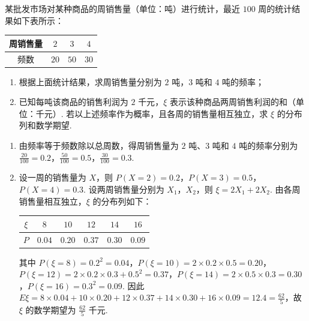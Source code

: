 \begin{problem}
某批发市场对某种商品的周销售量（单位：吨）进行统计，最近 \(100\text{ 周}\)的统计结果如下表所示：

\begin{center}
\begin{tabular}{c|ccc}
周销售量 & \(2\) & \(3\) & \(4\) \\
\hline
频数 & \(20\) & \(50\) & \(30\)
\end{tabular}
\end{center}

\begin{enumerate}
\item 根据上面统计结果，求周销售量分别为 \(2\text{ 吨}\)，\(3\text{ 吨}\)和 \(4\text{ 吨}\)的频率；
\item 已知每吨该商品的销售利润为 \(2\text{ 千元}\)，\(\xi\) 表示该种商品两周销售利润的和（单位：千元）. 若以上述频率作为概率，且各周的销售量相互独立，求 \(\xi\) 的分布列和数学期望.
\end{enumerate}
\end{problem}

\begin{solution}
\begin{enumerate}
\item 由频率等于频数除以总周数，得周销售量为 \(2\) 吨、\(3\) 吨和 \(4\) 吨的频率分别为 \(\frac{20}{100}=0.2\)，\(\frac{50}{100}=0.5\)，\(\frac{30}{100}=0.3\).

\item 设一周的销售量为 \(X\)，则 \(P(X=2)=0.2\)，\(P(X=3)=0.5\)，\(P(X=4)=0.3\). 设两周销售量分别为 \(X_1\)，\(X_2\)，则 \(\xi=2X_1+2X_2\). 由各周销售量相互独立，\(\xi\) 的分布列如下：

\begin{center}
\begin{tabular}{c|ccccc}
\(\xi\) & \(8\) & \(10\) & \(12\) & \(14\) & \(16\) \\
\hline
\(P\) & \(0.04\) & \(0.20\) & \(0.37\) & \(0.30\) & \(0.09\)
\end{tabular}
\end{center}

其中 \(P(\xi=8)=0.2^{2}=0.04\)，\(P(\xi=10)=2\times0.2\times0.5=0.20\)，\(P(\xi=12)=2\times0.2\times0.3+0.5^{2}=0.37\)，\(P(\xi=14)=2\times0.5\times0.3=0.30\)，\(P(\xi=16)=0.3^{2}=0.09\). 因此 \(E\xi=8\times0.04+10\times0.20+12\times0.37+14\times0.30+16\times0.09=12.4=\frac{62}{5}\)，故 \(\xi\) 的数学期望为 \(\frac{62}{5}\) 千元.
\end{enumerate}
\end{solution}

